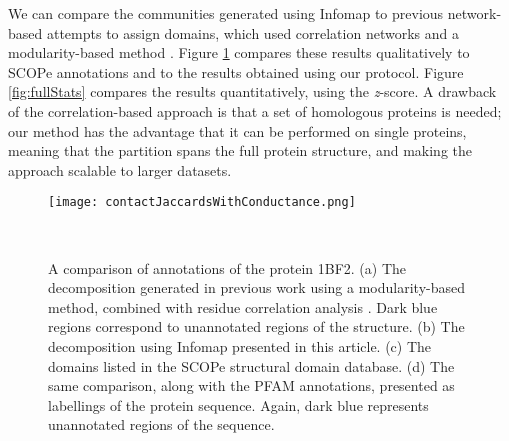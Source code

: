 \documentclass[a4paper,numbib, final, twoside, titelpage]{imaiai}%
\begin{document}
We can compare the communities generated using Infomap to previous network-based attempts to assign domains, which used correlation networks and a modularity-based method \cite{Hleap13}. Figure \ref{fig:1bf2} compares these results qualitatively to SCOPe annotations and to the results obtained using our protocol. Figure \ref{fig:fullStats} compares the results quantitatively, using the \textit{z}-score. A drawback of the correlation-based approach is that a set of homologous proteins is needed; our method has the advantage that it can be performed on single proteins, meaning that the partition spans the full protein structure, and making the approach scalable to larger datasets.

\newpage
\begin{figure}[h!]
    \centering
    \vspace{-2cm}
    \texttt{[image: contactJaccardsWithConductance.png]}
    \caption{The conductance of the PFAM domain, when mapped onto the network, against the modified JI (indicating how well it corresponds to the community structure) The conductance is 0 for perfectly-isolated communities, and 1 for communities fully connected to the rest of the network, so we expect a negative correlation between modified JI and conductance; this is seen for the proteins studied here.} \label{fig:conductance}


    \begin{center}
        \quad
        \quad
        \\
        \caption[1BF2]{A comparison of annotations of the protein 1BF2. (a) The decomposition generated in previous work using a modularity-based method, combined with residue correlation analysis \cite{Hleap13}. Dark blue regions correspond to unannotated regions of the structure. (b) The decomposition using Infomap presented in this article. (c) The domains listed in the SCOPe structural domain database. (d) The same comparison, along with the PFAM annotations, presented as labellings of the protein sequence. Again, dark blue represents unannotated regions of the sequence. }
        \label{fig:1bf2}
    \end{center}
    \vspace{-2cm}
\end{figure}
\newpage
\end{document}
